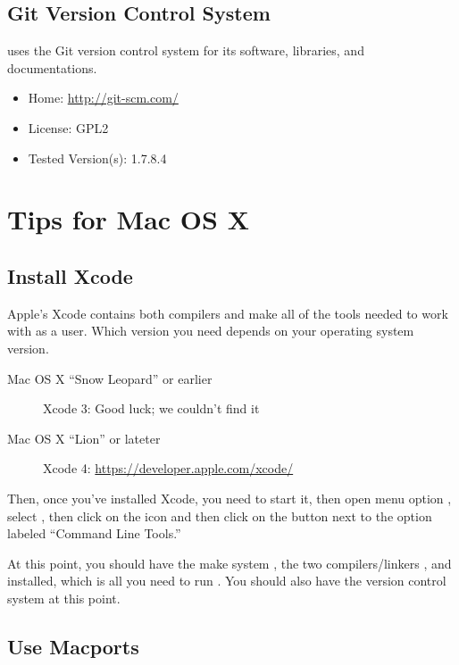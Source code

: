 \subsection{Git Version Control System}

\Stan uses the Git version control system for its software, libraries,
and documentations.  
% 
\begin{itemize}
\item Home: \url{http://git-scm.com/}
\item License: GPL2
\item Tested Version(s): 1.7.8.4
\end{itemize}



\section{Tips for Mac OS X}

\subsection{Install Xcode}

Apple's Xcode contains both compilers and make all of the tools needed 
to work with \Stan as a user.  Which version you need depends on your
operating system version.

\begin{description}
\item[Mac OS X ``Snow Leopard'' or earlier]
Xcode 3: Good luck; we couldn't find it
\item[Mac OS X ``Lion'' or lateter]
Xcode 4: \url{https://developer.apple.com/xcode/}
\end{description}

Then, once you've installed Xcode, you need to start it, then open
menu option , select , then click on the
 icon and then click on the  button next
to the option labeled ``Command Line Tools.''

At this point, you should have the make system , the two
\Cpp compilers/linkers , and  installed, which
is all you need to run \Stan.  You should also have the 
version control system at this point.

\subsection{Use Macports}

